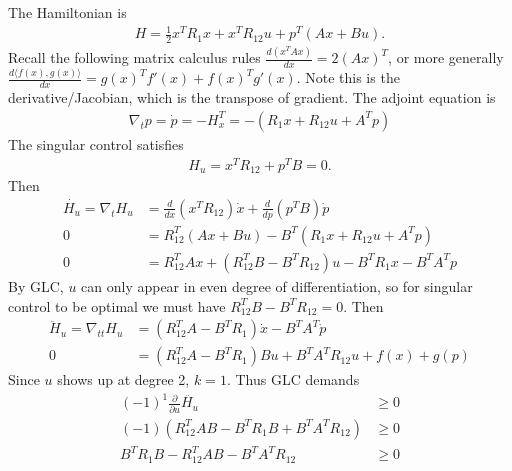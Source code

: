 \documentclass[12pt]{article}
\begin{document}
\begin{problem}[7]
The Hamiltonian is
\begin{align*}
	H = \frac{1}{2} x^{T} R_1 x + x^{T} R_{12} u + p ^{T} (Ax+Bu) .
\end{align*}
Recall the following matrix calculus rules $ \frac{d (x^{T}Ax)}{dx} = 2(Ax)^{T} $, or more generally $ \frac{d \langle f(x),g(x) \rangle}{dx} = g(x)^{T} f'(x) + f(x)^{T} g'(x)$. Note this is the derivative/Jacobian, which is the transpose of gradient. The adjoint equation is
\begin{align*}
	\nabla_t p =\dot{p} = -H_x^{T} = -(R_1 x + R_{12} u + A^{T} p)  
\end{align*}
The singular control satisfies
\begin{align*}
	H_u = x^{T}R_{12} + p ^{T}B =0.
\end{align*}
Then
\begin{align*}
	\dot{H_u} = \nabla_t H_u &= \frac{d}{dx} (x^{T} R_{12}) \dot{x} + \frac{d}{dp} (p ^{T}B) \dot{p} \\
	0&= R_{12}^{T}(Ax+Bu) - B^{T}(R_1 x + R_{12} u + A^{T}p) \\
	0&= R_{12}^{T} A x + (R_{12}^{T}B - B^{T}R_{12})u - B^{T}R_1x - B^{T}A^{T}p 
\end{align*}
By GLC, $ u$ can only appear in even degree of differentiation, so for singular control to be optimal we must have  $ R_{12}^{T}B - B^{T} R_{12} = 0$. Then
\begin{align*}
	\ddot{H}_u=\nabla_{tt} H_u &= (R_{12}^{T}A-B^{T}R_1)\dot{x} -B^{T}A^{T}\dot{p} \\ 
	0&= (R_{12}^{T}A-B^{T}R_1)Bu +B^{T}A^{T}R_{12}u + f(x)+g(p) 
\end{align*}
Since $ u$ shows up at degree 2,  $ k=1$. Thus GLC demands
\begin{align*}
	(-1)^{1} \frac{\partial }{\partial u} \ddot{H_u} &\geq 0\\
	(-1) (R_{12}^{T} AB - B^{T}R_1B+B^{T}A^{T}R_{12}) & \geq 0\\
	B^{T}R_1B - R_{12}^{T}AB - B^{T}A^{T}R_{12} &\geq 0
\end{align*}
\end{problem}
\end{document}
